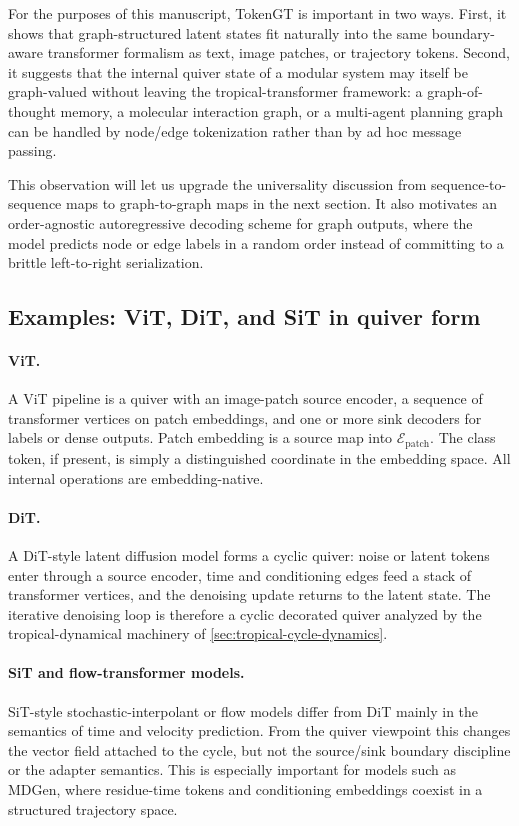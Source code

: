 \documentclass[11pt]{article}
\theoremstyle{definition}
\theoremstyle{plain}
\theoremstyle{remark}
\newcommand{\mc}[1]{\mathcal{#1}}
\newcommand{\Emb}{\mc{E}}
\begin{document}
For the purposes of this manuscript, TokenGT is important in two ways.
First, it shows that graph-structured latent states fit naturally into the same boundary-aware transformer formalism as text, image patches, or trajectory tokens.
Second, it suggests that the internal quiver state of a modular system may itself be graph-valued without leaving the tropical-transformer framework:
a graph-of-thought memory, a molecular interaction graph, or a multi-agent planning graph can be handled by node/edge tokenization rather than by ad hoc message passing.

This observation will let us upgrade the universality discussion from sequence-to-sequence maps to graph-to-graph maps in the next section.
It also motivates an order-agnostic autoregressive decoding scheme for graph outputs, where the model predicts node or edge labels in a random order instead of committing to a brittle left-to-right serialization.

\subsection{Examples: ViT, DiT, and SiT in quiver form}
\label{sec:vit-dit-sit}

\paragraph{ViT.}
A ViT pipeline is a quiver with an image-patch source encoder, a sequence of transformer vertices on patch embeddings, and one or more sink decoders for labels or dense outputs.
Patch embedding is a source map into $\Emb_{\text{patch}}$.
The class token, if present, is simply a distinguished coordinate in the embedding space.
All internal operations are embedding-native.

\paragraph{DiT.}
A DiT-style latent diffusion model forms a cyclic quiver:
noise or latent tokens enter through a source encoder, time and conditioning edges feed a stack of transformer vertices, and the denoising update returns to the latent state.
The iterative denoising loop is therefore a cyclic decorated quiver analyzed by the tropical-dynamical machinery of \cref{sec:tropical-cycle-dynamics}.

\paragraph{SiT and flow-transformer models.}
SiT-style stochastic-interpolant or flow models differ from DiT mainly in the semantics of time and velocity prediction.
From the quiver viewpoint this changes the vector field attached to the cycle, but not the source/sink boundary discipline or the adapter semantics.
This is especially important for models such as MDGen, where residue-time tokens and conditioning embeddings coexist in a structured trajectory space.
\end{document}

